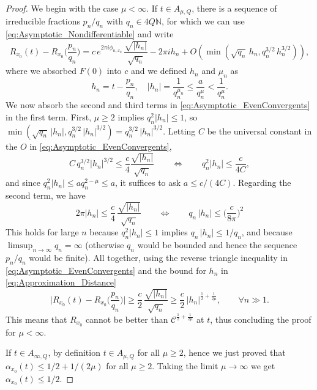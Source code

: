 \documentclass[11pt,reqno]{amsart}
\theoremstyle{definition}
\begin{document}
\begin{proof}
We begin with the case $\mu < \infty$. 
If $t \in  A_{\mu,Q}$, 
there is a sequence of irreducible fractions $p_n/q_n$ with $q_n \in 4Q\mathbb N$, for which  
we can use \eqref{eq:Asymptotic_Nondifferentiable} and write
\begin{equation}\label{eq:Asymptotic_EvenConvergents}
	R_{x_0}\left( t  \right)  - R_{x_0}\Big( \frac{p_n}{q_n} \Big) 
 =    c \, e^{2\pi i \phi_{n,x_0}} \,  \frac{\sqrt{|h_n|}}{\sqrt{q_n}} - 2\pi i h_n +  O\left( \min \left( \sqrt{q_n} \, h_n , q_n^{3/2}\, h_n^{3/2}  \right) \right),
	\end{equation}
where we absorbed $F(0)$ into $c$ and we defined $h_n$ and $\mu_n$ as 
\begin{equation}\label{eq:Approximation_Distance}
h_n = t - \frac{p_n}{q_n}, \quad 
|h_n|
= \frac{1}{q_n^{\mu_n}} \leq \frac{a}{q_n^\mu} < \frac{1}{q_n^\mu}. 
\end{equation}
We now absorb the second and third terms in \eqref{eq:Asymptotic_EvenConvergents} in the first term.
First, $\mu \geq 2$ implies $q_n^2 |h_n| \leq 1$,  
so 
$
	\min ( \sqrt{q_n} \, |h_n| , q_n^{3/2}\, |h_n|^{3/2} ) = q_n^{3/2}\, |h_n|^{3/2}. 
$
Letting $C$  be the universal constant in the $O$ in \eqref{eq:Asymptotic_EvenConvergents},  
\begin{equation}
C\, q_n^{3/2} |h_n|^{3/2} \leq \frac{c}{4}  \frac{\sqrt{|h_n|}}{\sqrt{q_n}}
\qquad  \Longleftrightarrow \qquad 
q_n^2 |h_n| \leq \frac{ c}{4C}, 
\end{equation}
and since $q_n^2 |h_n| \leq a q_n^{2 - \mu } \leq a$, 
it suffices to ask $a \leq c/(4C)$. 
Regarding the second term, we have
\begin{equation}
2\pi |h_n| \leq \frac{c}{4} \,   \frac{  \sqrt{|h_n|}}{\sqrt{q_n} }
 \qquad \Longleftrightarrow  \qquad 
 q_n \, |h_n| \leq \Big( \frac{c}{8\pi} \Big)^2 
\end{equation}
This holds for large $n$ because $q_n^2 |h_n| \leq 1$ implies $q_n \, |h_n| \leq 1/q_n$, and because $\limsup_{n \to \infty} q_n = \infty$ (otherwise $q_n$ would be bounded and hence the sequence $p_n/q_n$ would be finite). 
All together, using the reverse triangle inequality in \eqref{eq:Asymptotic_EvenConvergents} and the bound for $h_n$ in \eqref{eq:Approximation_Distance}
\begin{equation}\label{eq:Asymptotic_EvenConvergents_LowerBound}
	\Big| R_{x_0}\left( t  \right)  - R_{x_0}\Big( \frac{p_n}{q_n} \Big)  \Big| \geq    \frac{c}{2}  \,  \frac{\sqrt{|h_n|}}{\sqrt{q_n}} \geq \frac{c}{2}  \,  |h_n|^{\frac12 + \frac{1}{2\mu}}, 
	\qquad \forall n \gg 1. 
\end{equation}
This means that $R_{x_0}$ cannot be better than $\mathcal C^{\frac12 + \frac{1}{2\mu}}$ at $t$, 
thus concluding the proof for $\mu < \infty$. 

If $t \in A_{ \infty,Q}$, by definition $t \in A_{\mu, Q}$ for all $\mu \geq 2$, hence we just proved that $\alpha_{x_0}(t) \leq 1/2 + 1/(2\mu)$ for all $\mu \geq 2$. Taking the limit $\mu \to \infty$ we get $\alpha_{x_0}(t) \leq 1/2$. 
\end{proof}
\end{document}
